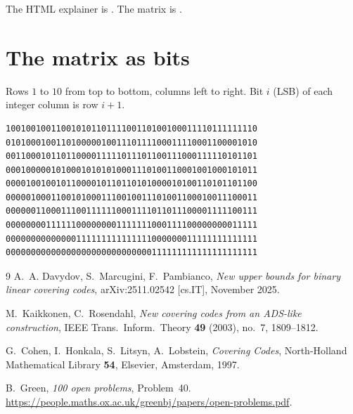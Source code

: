 \documentclass[11pt,a4paper]{article}
\begin{document}
The HTML explainer is
\href{https://github.com/wustep/maths/blob/main/problems/covering/explainer.html}{}.
The matrix is
\href{https://github.com/wustep/maths/blob/main/problems/covering/result/data/H_r10_n50.txt}{}.

\appendix
\section{The matrix as bits}

Rows $1$ to $10$ from top to bottom, columns left to right. Bit $i$
(LSB) of each integer column is row $i+1$.

{\small
\begin{verbatim}
10010010011001010110111100110100100011110111111110
01010001001101000001001110111100011110001100001010
00110001011011000011111011101100111000111110101101
00010000010100010101010001110100110001001000101011
00001001001011000010110110101000010100110101101100
00000100011001010001110010011101001100010011100011
00000011000111001111110001111011011100001111100111
00000000111111000000001111111000111100000000011111
00000000000000111111111111111000000011111111111111
00000000000000000000000000000111111111111111111111
\end{verbatim}
}

\begin{thebibliography}{9}
A.~A. Davydov, S.~Marcugini, F.~Pambianco,
\emph{New upper bounds for binary linear covering codes},
arXiv:2511.02542 [cs.IT], November 2025.

M.~Kaikkonen, C.~Rosendahl,
\emph{New covering codes from an ADS-like construction},
IEEE Trans.\ Inform.\ Theory \textbf{49} (2003), no.~7, 1809--1812.

G.~Cohen, I.~Honkala, S.~Litsyn, A.~Lobstein,
\emph{Covering Codes}, North-Holland Mathematical Library \textbf{54},
Elsevier, Amsterdam, 1997.

B.~Green, \emph{100 open problems}, Problem~40.
\url{https://people.maths.ox.ac.uk/greenbj/papers/open-problems.pdf}.
\end{thebibliography}
\end{document}
